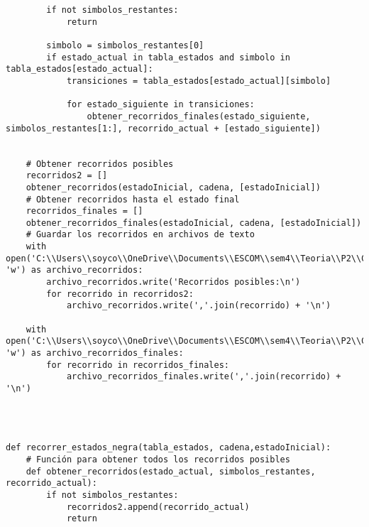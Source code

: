 \begin{lstlisting}
        if not simbolos_restantes:
            return

        simbolo = simbolos_restantes[0]
        if estado_actual in tabla_estados and simbolo in tabla_estados[estado_actual]:
            transiciones = tabla_estados[estado_actual][simbolo]

            for estado_siguiente in transiciones:
                obtener_recorridos_finales(estado_siguiente, simbolos_restantes[1:], recorrido_actual + [estado_siguiente])

    
    # Obtener recorridos posibles
    recorridos2 = []
    obtener_recorridos(estadoInicial, cadena, [estadoInicial])
    # Obtener recorridos hasta el estado final
    recorridos_finales = []
    obtener_recorridos_finales(estadoInicial, cadena, [estadoInicial])
    # Guardar los recorridos en archivos de texto
    with open('C:\\Users\\soyco\\OneDrive\\Documents\\ESCOM\\sem4\\Teoria\\P2\\Chess\\output\\recorridos_blanca.txt', 'w') as archivo_recorridos:
        archivo_recorridos.write('Recorridos posibles:\n')
        for recorrido in recorridos2:
            archivo_recorridos.write(','.join(recorrido) + '\n')

    with open('C:\\Users\\soyco\\OneDrive\\Documents\\ESCOM\\sem4\\Teoria\\P2\\Chess\\output\\recorridos_finales_blanca.txt', 'w') as archivo_recorridos_finales:
        for recorrido in recorridos_finales:
            archivo_recorridos_finales.write(','.join(recorrido) + '\n')




def recorrer_estados_negra(tabla_estados, cadena,estadoInicial):
    # Función para obtener todos los recorridos posibles
    def obtener_recorridos(estado_actual, simbolos_restantes, recorrido_actual):
        if not simbolos_restantes:
            recorridos2.append(recorrido_actual)
            return


\end{lstlisting}
